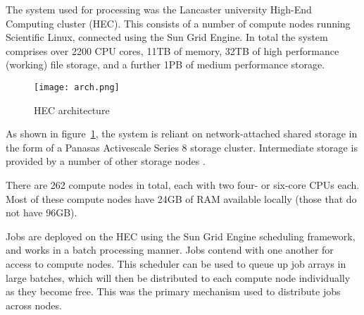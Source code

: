 The system used for processing was the Lancaster university High-End Computing cluster (HEC).  This consists of a number of compute nodes running Scientific Linux, connected using the Sun Grid Engine.  In total the system comprises over 2200 CPU cores, 11TB of memory, 32TB of high performance (working) file storage, and a further 1PB of medium performance storage.


\begin{figure}[h]
    \centering
    \texttt{[image: arch.png]}
    \caption{HEC architecture}
    \label{fig:arch}
\end{figure}

As shown in figure~\ref{fig:arch}, the system is reliant on network-attached shared storage in the form of a Panasas Activescale Series 8 storage cluster.  Intermediate storage is provided by a number of other storage nodes .

There are 262 compute nodes in total, each with two four- or six-core CPUs each.  Most of these compute nodes have 24GB of RAM available locally (those that do not have 96GB).

Jobs are deployed on the HEC using the Sun Grid Engine scheduling framework, and works in a batch processing manner.  Jobs contend with one another for access to compute nodes.  This scheduler can be used to queue up job arrays in large batches, which will then be distributed to each compute node individually as they become free.  This was the primary mechanism used to distribute jobs across nodes.

